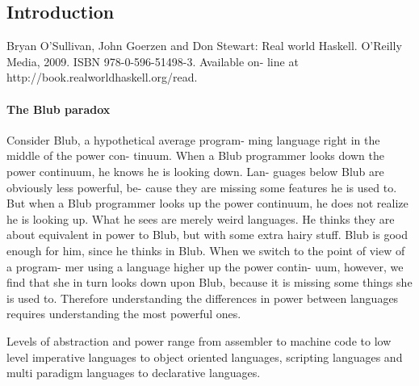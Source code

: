 \subsection{Introduction}
Bryan O’Sullivan, John Goerzen and Don
Stewart: Real world Haskell. O’Reilly Media,
2009. ISBN 978-0-596-51498-3. Available on-
line at http://book.realworldhaskell.org/read.

\paragraph{The Blub paradox}
Consider Blub, a hypothetical average program-
ming language right in the middle of the power con-
tinuum.
When a Blub programmer looks down the power
continuum, he knows he is looking down. Lan-
guages below Blub are obviously less powerful, be-
cause they are missing some features he is used to.
But when a Blub programmer looks up the power
continuum, he does not realize he is looking up.
What he sees are merely weird languages. He thinks
they are about equivalent in power to Blub, but
with some extra hairy stuff. Blub is good enough
for him, since he thinks in Blub.
When we switch to the point of view of a program-
mer using a language higher up the power contin-
uum, however, we find that she in turn looks down
upon Blub, because it is missing some things she is
used to.
Therefore understanding the differences in power
between languages requires understanding the most
powerful ones.

Levels of abstraction and power range from assembler to machine code to low level imperative languages to object oriented languages, scripting languages and multi paradigm languages to declarative languages.


